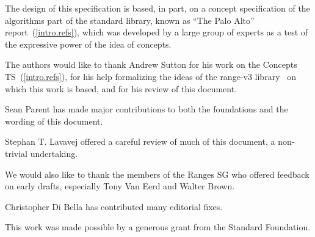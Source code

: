 
The design of this specification is based, in part, on a concept
specification of the algorithms part of the \Cpp standard library, known
as ``The Palo Alto'' report~(\ref{intro.refs}), which was developed by a large
group of experts as a test of the expressive power of the idea of
concepts.

The authors would like to thank Andrew Sutton for his work on the Concepts TS~(\ref{intro.refs}),
for his help formalizing the ideas of the range-v3 library~\cite{range-v3} on which this
work is based, and for his review of this document.

Sean Parent has made major contributions to both the foundations and the wording of this
document.

Stephan T. Lavavej offered a careful review of much of this document, a non-trivial undertaking.

We would also like to thank the members of the Ranges SG who offered feedback on early drafts,
especially Tony Van Eerd and Walter Brown.

Christopher Di Bella has contributed many editorial fixes.

This work was made possible by a generous grant from the Standard \Cpp Foundation.
